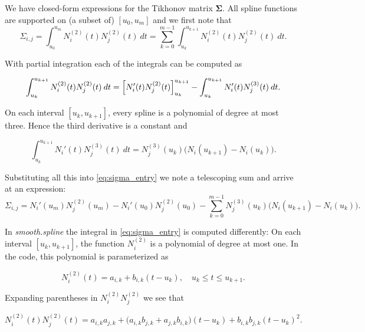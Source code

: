 \documentclass[a4paper]{scrartcl}
\newcommand{\mat}[1]{\ensuremath{\bm{#1}}}
\newcommand\dd{\ensuremath{\:d}}
\begin{document}
We have closed-form expressions for the Tikhonov matrix $\mat\Sigma$.
All spline functions are supported on (a subset of) $[u_0, u_m]$ and we first note that
\begin{equation}
    \label{eq:sigma_entry}
    \Sigma_{i,j}
    = \int_{u_0}^{u_m} N_i^{(2)}(t) N_j^{(2)}(t) \dd t
    = \sum_{k = 0}^{m - 1} \int_{u_k}^{u_{k+1}} N_i^{(2)}(t) N_j^{(2)}(t) \dd t.
\end{equation}

With partial integration each of the integrals can be computed as

\begin{equation*}
    \int_{u_k}^{u_{k+1}} N_i^{(2)}(t) N_j^{(2)}(t) \dd t
    = \Bigl[ N_i'(t) N_j^{(2)}(t) \Bigr]_{u_k}^{u_{k+1}} -
    \int_{u_k}^{u_{k+1}} N_i'(t) N_j^{(3)}(t) \dd t.
\end{equation*}

On each interval $[u_k, u_{k+1}]$, every spline is a polynomial of degree at most three.
Hence the third derivative is a constant and

\begin{equation*}
    \int_{u_k}^{u_{k+1}} N_i'(t) N_j^{(3)}(t) \dd t
    = N_j^{(3)}(u_k) \bigl(N_i(u_{k+1}) - N_i(u_k)\bigr).
\end{equation*}

Substituting all this into \cref{eq:sigma_entry} we note a telescoping sum and arrive at an expression:
\begin{equation*}
    \Sigma_{i,j}
    = N_i'(u_m) N_j^{(2)}(u_m) - N_i'(u_0) N_j^{(2)}(u_0) 
    - \sum_{k = 0}^{m - 1} N_j^{(3)}(u_k) \bigl(N_i(u_{k+1}) - N_i(u_k)\bigr).
\end{equation*}

In \textit{smooth.spline} the integral in \cref{eq:sigma_entry} is computed differently:
On each interval $[u_k, u_{k+1}]$, the function $N_i^{(2)}$ is a polynomial of degree at most one.
In the code, this polynomial is parameterized as

\begin{equation*}
    N_i^{(2)}(t) 
    = a_{i,k} + b_{i,k} (t - u_k), 
    \quad u_k\leq t\leq u_{k+1}.
\end{equation*}

Expanding parentheses in $N_i^{(2)} N_j^{(2)}$ we see that

\begin{equation*}
    N_i^{(2)}(t) N_j^{(2)}(t)
    = a_{i,k} a_{j,k} + \bigl(a_{i,k} b_{j,k} + a_{j,k} b_{i,k}\bigr) (t - u_k) + b_{i,k} b_{j,k} (t - u_k)^2.
\end{equation*}
\end{document}
